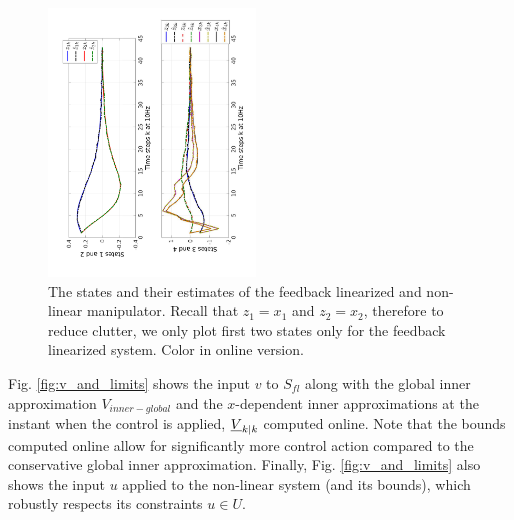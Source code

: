 \begin{figure}
\includegraphics[angle=270,width=0.49\textwidth]{figs/AllStates_manip.pdf}
\caption{The states and their estimates of the feedback linearized and non-linear manipulator. Recall that $z_1 = x_1$ and $z_2=x_2$, therefore to reduce clutter, we only plot first two states only for the feedback linearized system. Color in online version.}
\label{fig:AllStates_manip}
\end{figure}





Fig. \ref{fig:v_and_limits} shows the input $v$ to $S_{fl}$ along with the global inner approximation $V_{inner-global}$ and the $x$-dependent inner approximations at the instant when the control is applied,  $\underline{V}_{k|k}$ computed online.
Note that the bounds computed online allow for significantly more control action compared to the conservative global inner approximation. 
Finally, Fig. \ref{fig:v_and_limits} also shows the input $u$ applied to the non-linear system (and its bounds), which robustly respects its constraints $u \in U$.

